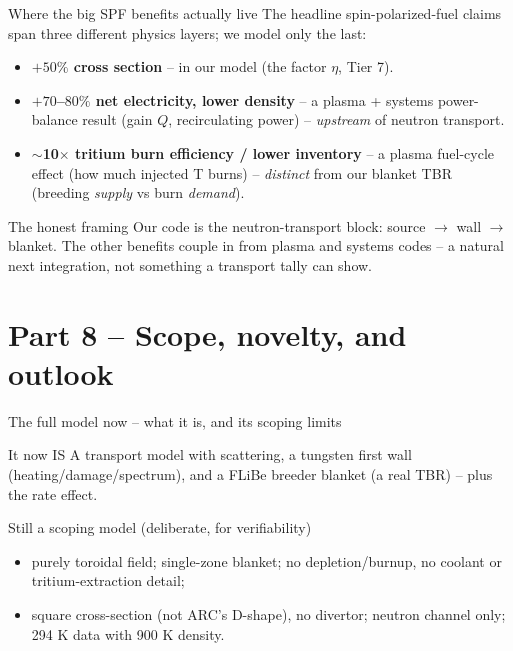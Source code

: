 \documentclass[aspectratio=169]{beamer}
\newcommand{\keyword}[1]{\textcolor{blue!60!black}{\textbf{#1}}}
\begin{document}
\begin{frame}{Where the big SPF benefits actually live}
  The headline spin-polarized-fuel claims span \alert{three different physics layers}; we model only the last:
  \begin{itemize}
    \item \keyword{$+50\%$ cross section} -- \alert{in our model} (the factor $\eta$, Tier 7).
    \item \keyword{$+70$--$80\%$ net electricity, lower density} -- a plasma + \alert{systems} power-balance result (gain $Q$, recirculating power) -- \emph{upstream} of neutron transport.
    \item \keyword{$\sim$10$\times$ tritium burn efficiency / lower inventory} -- a plasma \alert{fuel-cycle} effect (how much injected T burns) -- \emph{distinct} from our blanket TBR (breeding \emph{supply} vs burn \emph{demand}).
  \end{itemize}
  \vfill
  \begin{block}{The honest framing}
    Our code is the \alert{neutron-transport block}: source $\to$ wall $\to$ blanket. The other benefits couple in from plasma and systems codes -- a natural next integration, not something a transport tally can show.
  \end{block}
\end{frame}

\section{Part 8 -- Scope, novelty, and outlook}
\begin{frame}{The full model now -- what it is, and its scoping limits}
  \begin{block}{It now IS}
    A transport model with \alert{scattering}, a \alert{tungsten first wall} (heating/damage/spectrum), and a \alert{FLiBe breeder blanket} (a real TBR) -- plus the \alert{rate} effect.
  \end{block}
  \begin{block}{Still a scoping model (deliberate, for verifiability)}
    \begin{itemize}\footnotesize
      \item purely \alert{toroidal} field; single-zone blanket; \alert{no depletion}/burnup, no coolant or tritium-extraction detail;
      \item \alert{square} cross-section (not ARC's D-shape), no divertor; neutron channel only; 294 K data with 900 K density.
    \end{itemize}
  \end{block}
\end{frame}
\end{document}
